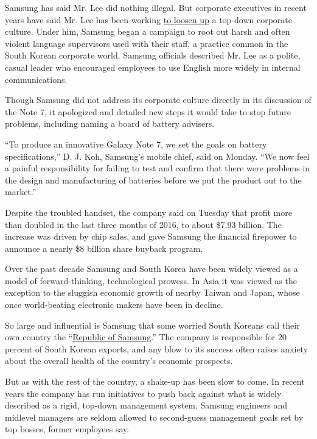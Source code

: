 Samsung has said Mr. Lee did nothing illegal. But corporate executives
in recent years have said Mr. Lee has been working
\href{https://www.nytimes3xbfgragh.onion/2017/01/16/business/lee-jae-yong-samsung.html}{to
loosen up} a top-down corporate culture. Under him, Samsung began a
campaign to root out harsh and often violent language supervisors used
with their staff, a practice common in the South Korean corporate world.
Samsung officials described Mr. Lee as a polite, casual leader who
encouraged employees to use English more widely in internal
communications.

Though Samsung did not address its corporate culture directly in its
discussion of the Note 7, it apologized and detailed new steps it would
take to stop future problems, including naming a board of battery
advisers.

``To produce an innovative Galaxy Note 7, we set the goals on battery
specifications,'' D. J. Koh, Samsung's mobile chief, said on Monday.
``We now feel a painful responsibility for failing to test and confirm
that there were problems in the design and manufacturing of batteries
before we put the product out to the market.''

Despite the troubled handset, the company said on Tuesday that profit
more than doubled in the last three months of 2016, to about \$7.93
billion. The increase was driven by chip sales, and gave Samsung the
financial firepower to announce a nearly \$8 billion share buyback
program.

Over the past decade Samsung and South Korea have been widely viewed as
a model of forward-thinking, technological prowess. In Asia it was
viewed as the exception to the sluggish economic growth of nearby Taiwan
and Japan, whose once world-beating electronic makers have been in
decline.

So large and influential is Samsung that some worried South Koreans call
their own country the
``\href{https://www.nytimes3xbfgragh.onion/2016/10/23/world/asia/galaxy-note-7-recall-south-korea-samsung.html}{Republic
of Samsung}.'' The company is responsible for 20 percent of South Korean
exports, and any blow to its success often raises anxiety about the
overall health of the country's economic prospects.

But as with the rest of the country, a shake-up has been slow to come.
In recent years the company has run initiatives to push back against
what is widely described as a rigid, top-down management system. Samsung
engineers and midlevel managers are seldom allowed to second-guess
management goals set by top bosses, former employees say.

